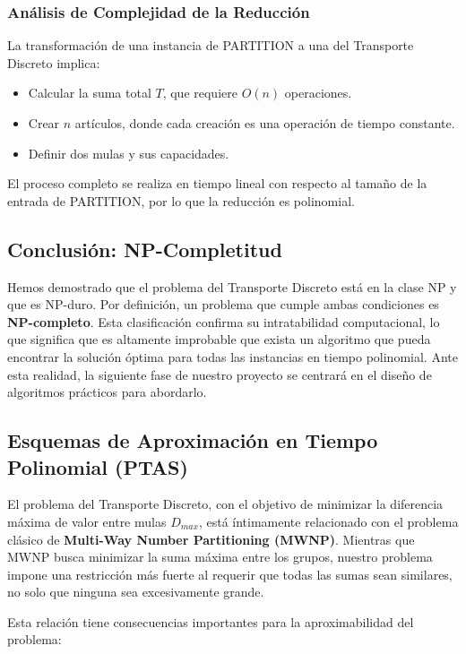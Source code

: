 \documentclass[12pt, a4paper]{article}
\begin{document}
    \subsubsection{Análisis de Complejidad de la Reducción}
    La transformación de una instancia de PARTITION a una del Transporte Discreto implica:
    \begin{itemize}
        \item Calcular la suma total $T$, que requiere $O(n)$ operaciones.
        \item Crear $n$ artículos, donde cada creación es una operación de tiempo constante.
        \item Definir dos mulas y sus capacidades.
    \end{itemize}

    El proceso completo se realiza en tiempo lineal con respecto al tamaño de la entrada de PARTITION, por lo que la reducción es polinomial.

    \subsection{Conclusión: NP-Completitud}
    Hemos demostrado que el problema del Transporte Discreto está en la clase NP y que es NP-duro. Por definición, un problema que cumple ambas condiciones es \textbf{NP-completo}. Esta clasificación confirma su intratabilidad computacional, lo que significa que es altamente improbable que exista un algoritmo que pueda encontrar la solución óptima para todas las instancias en tiempo polinomial. Ante esta realidad, la siguiente fase de nuestro proyecto se centrará en el diseño de algoritmos prácticos para abordarlo.

    \subsection{Esquemas de Aproximación en Tiempo Polinomial (PTAS)}

    El problema del Transporte Discreto, con el objetivo de minimizar la diferencia máxima de valor entre mulas \(D_{max}\), está íntimamente relacionado con el problema clásico de \textbf{Multi-Way Number Partitioning (MWNP)}. Mientras que MWNP busca minimizar la suma máxima entre los grupos, nuestro problema impone una restricción más fuerte al requerir que todas las sumas sean similares, no solo que ninguna sea excesivamente grande.

    Esta relación tiene consecuencias importantes para la aproximabilidad del problema:
\end{document}
